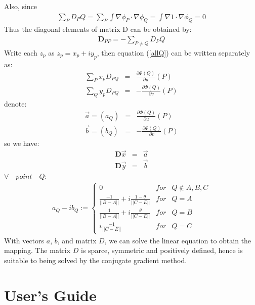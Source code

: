 \documentclass{InsightArticle}
\begin{document}
  Also, since
   \begin{eqnarray}  
      \sum_P D_PQ = \sum_P \int \nabla \phi_P \cdot \nabla \phi_Q = \int \nabla 1 \cdot \nabla \phi_Q = 0
  \end{eqnarray}
  Thus the diagonal elements of matrix D can be obtained by:
    \begin{eqnarray}
      \mathbf{D}_{PP} = -\sum_{P \ne Q}D_PQ \label{diagonalOfD}
    \end{eqnarray}    
    Write each $z_p$ as $z_p=x_p + iy_p$, then
    equation (\ref{allQ}) can be written separately as:
    \begin{eqnarray}
      \sum_{P}x_p D_{PQ} &=& \frac{\partial \Phi(Q)}{\partial u}(P) \nonumber\\
      \sum_{Q}y_p D_{PQ} &=& -\frac{\partial \Phi(Q)}{\partial v} (P)
    \end{eqnarray}  
    denote:
    \begin{eqnarray}
      \vec{a} = (a_Q) &=& \frac{\partial \Phi(Q)}{\partial u}(P) \nonumber \\
      \vec{b} = (b_Q) &=& -\frac{\partial \Phi(Q)}{\partial v} (P)
    \end{eqnarray}  
    so we have:
    \begin{eqnarray}
      \mathbf{D}\vec{x} &=& \vec{a} \nonumber \\
      \mathbf{D}\vec{y} &=& \vec{b} \label{z}
    \end{eqnarray}    
    $\forall \quad point \quad Q$:
    \begin{eqnarray}
      a_Q - ib_Q := \left\{
      \begin{array}{lcl}
        0 & for & Q \notin {A, B, C} \\
        \frac{-1}{||B-A||} + i\frac{1-\theta}{||C-E||} & for & Q = A \\
        \frac{1}{||B-A||} + i\frac{\theta}{||C-E||} & for & Q = B \\
        i\frac{-1}{||C-E||} & for & Q = C
      \end{array} \right. \label{ab}
    \end{eqnarray}      
With vectors $a$, $b$, and matrix $D$, we can solve the linear
equation to obtain the mapping. The matrix $D$ is sparce, symmetric
and positively defined, hence is suitable to being solved by the
conjugate gradient method.

\section{User's Guide}
\end{document}
